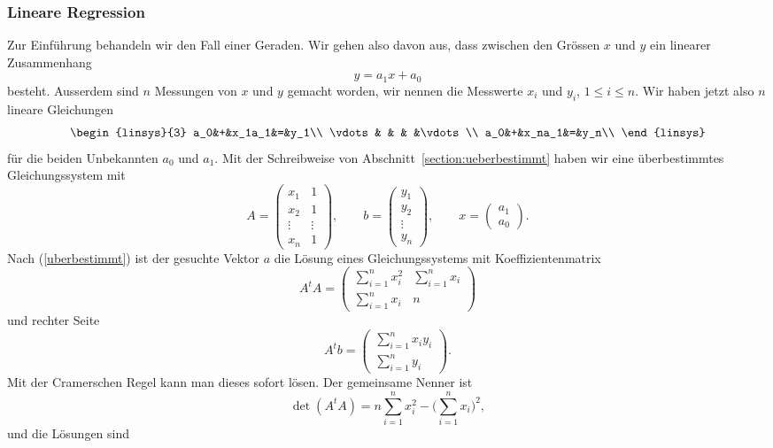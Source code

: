 \subsubsection{Lineare Regression}
Zur Einführung behandeln wir den Fall einer Geraden. Wir gehen also
davon aus, dass zwischen den Grössen $x$ und $y$ ein linearer
Zusammenhang
\[
y=a_1x+a_0
\]
besteht. Ausserdem sind $n$ Messungen von $x$ und $y$ gemacht worden,
wir nennen die Messwerte $x_i$ und $y_i$, $1\le i\le n$. Wir haben 
jetzt also $n$ lineare Gleichungen
\[
\begin{linsys}{3}
a_0&+&x_1a_1&=&y_1\\
\vdots& &   & &\vdots\\
a_0&+&x_na_1&=&y_n\\
\end{linsys}
\]
für die beiden Unbekannten $a_0$ und $a_1$.
Mit der Schreibweise von Abschnitt~\ref{section:ueberbestimmt} haben wir eine
überbestimmtes Gleichungssystem mit
\[
A=\begin{pmatrix}
x_1&1\\
x_2&1\\
\vdots&\vdots\\
x_n&1
\end{pmatrix},\qquad
b=\begin{pmatrix}
y_1\\y_2\\\vdots\\y_n
\end{pmatrix},\qquad
x=\begin{pmatrix}
a_1\\a_0
\end{pmatrix}.
\]
Nach (\ref{uberbestimmt}) ist der gesuchte Vektor $a$ die Lösung
eines Gleichungssystems mit Koeffizientenmatrix
\[
A^tA=\begin{pmatrix}
\sum_{i=1}^nx_i^2&\sum_{i=1}^nx_i\\
\sum_{i=1}^nx_i&n
\end{pmatrix}
\]
und rechter Seite
\[
A^tb=\begin{pmatrix}
\sum_{i=1}^nx_iy_i\\
\sum_{i=1}^ny_i
\end{pmatrix}.
\]
Mit der Cramerschen Regel kann man dieses sofort lösen. Der gemeinsame
Nenner ist 
\[
\det(A^tA)=n\sum_{i=1}^nx_i^2-\biggl(\sum_{i=1}^nx_i\biggr)^2,
\]
und die Lösungen sind

